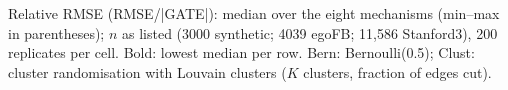 \begin{table}[t]
\caption{Relative RMSE (RMSE/|GATE|): median over the eight mechanisms (min--max in parentheses); $n$ as listed (3000 synthetic; 4039 egoFB; 11{,}586 Stanford3), 200 replicates per cell. Bold: lowest median per row. Bern: Bernoulli(0.5); Clust: cluster randomisation with Louvain clusters ($K$ clusters, fraction of edges cut).}\label{tab:e2}
\centering\small
\setlength{\tabcolsep}{3pt}

\end{table}
